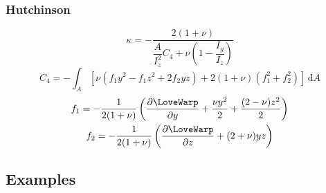 \subsubsection{Hutchinson}
\cite{hutchinson2001shear}
\begin{equation}
\kappa=-\dfrac{2(1+\nu)}{\dfrac{A}{I_z^2} C_4+\nu\left(1-\dfrac{I_y}{I_z}\right)}
\end{equation}
\begin{equation*}
C_4=-\int_A\left[\nu\left(f_1 y^2-f_1 z^2+2 f_2 y z\right)+2(1+\nu)\left(f_1^2+f_2^2\right)\right]\,\mathrm{d} A
\end{equation*}
\begin{equation}
\begin{gathered}
f_1=-\frac{1}{2(1+\nu)}\left(\frac{\partial \LoveWarp}{\partial y}+\frac{\nu y^2}{2}+\frac{(2-\nu) z^2}{2}\right) \\
f_2=-\frac{1}{2(1+\nu)}\left(\frac{\partial \LoveWarp}{\partial z}+(2+\nu) y z\right)
\end{gathered}
\end{equation}

\subsection{Examples}

